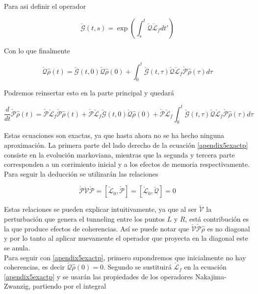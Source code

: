 \begin{appendixs}
Para asi definir el operador

\begin{equation*}
    \check{\mathcal{G}}(t,s) = \exp\left(  \int_{s}^{t}\check{\mathcal{Q}}\check{\mathcal{L}}_{f}dt' \right)
\end{equation*}

Con lo que finalmente

\begin{equation*}
    \check{\mathcal{Q}}\hat{\rho}(t) = \check{\mathcal{G}}(t,0)\check{\mathcal{Q}}\hat{\rho}(0) + \int_{0}^{t}\check{\mathcal{G}}(t,\tau)\check{\mathcal{Q}}\check{\mathcal{L}}_{f} \check{\mathcal{P}}\hat{\rho}(\tau)d\tau    
\end{equation*}

Podremos reinsertar esto en la parte principal y quedará

\begin{equation}
    \frac{d}{dt}\check{\mathcal{P}}\hat{\rho}(t) = \check{\mathcal{P}}\check{\mathcal{L}}_{f}\check{\mathcal{P}}\hat{\rho}(t) + \check{\mathcal{P}}\check{\mathcal{L}}_{f}\check{\mathcal{G}}(t,0)\check{\mathcal{Q}}\hat{\rho}(0) + \check{\mathcal{P}}\check{\mathcal{L}}_{f}\int_{0}^{t}\check{\mathcal{G}}(t,\tau)\check{\mathcal{Q}}\check{\mathcal{L}}_{f} \check{\mathcal{P}}\hat{\rho}(\tau)d\tau    
    \label{apendix5exactp}
\end{equation}

Estas ecuaciones son exactas, ya que hasta ahora no se ha hecho ninguna aproximación. La primera parte del lado derecho de la ecuación \ref{apendix5exactp} consiste en la evolución markoviana, mientras que la segunda y  tercera parte corresponden a un corrimiento inicial y a los efectos de memoria respectivamente. Para seguir la deducción se utilizarán las relaciones

\begin{equation*}
    \check{\mathcal{P}}\check{\mathcal{V}}\check{\mathcal{P}} = [\check{\mathcal{L}}_0,\check{\mathcal{P}}] = [\check{\mathcal{L}}_0,\check{\mathcal{Q}}] = 0 
\end{equation*}

Estas relaciones se pueden explicar intuitivamente, ya que al ser $\check{\mathcal{V}}$ la perturbación que genera el tunneling entre los puntos $L$ y $R$, está contribución es la que produce efectos de coherencias. Así se puede notar que $\check{\mathcal{V}}\check{\mathcal{P}}\hat{\rho}$ es no diagonal y por lo tanto al aplicar nuevamente el operador que proyecta en la diagonal este se anula.
\\
Para seguir con \ref{apendix5exactp}, primero supondremos que inicialmente no hay coherencias, es decir $\check{\mathcal{Q}}\hat{\rho}(0) = 0$. Segundo se sustituirá $\check{\mathcal{L}}_{f}$ en la ecuación \ref{apendix5exactp} y se usarán las propiedades de los operadores Nakajima-Zwanzig, partiendo por el integral


\end{appendixs}
